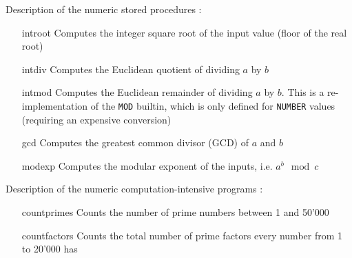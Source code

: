 \documentclass[twoside,11pt,a4paper]{article}
\newcommand{\todo}[1]{\textit{TODO: #1}}
\newcommand{\sql}[1]{\texttt{#1}}
\newcommand{\pls}[1]{\small\texttt{#1}\normalsize}
\newcommand{\plstype}[1]{\pls{#1}}
\newcommand{\oranum}{\plstype{NUMBER}}
\newcommand{\bench}[1]{\textsf{#1}}
\begin{document}
\vspace{5mm}
Description of the numeric stored procedures :
\begin{itemize}
\item[\bench{introot}] Computes the integer square root of the input value (floor of the real root)
\item[\bench{intdiv}] Computes the Euclidean quotient of dividing $a$ by $b$
\item[\bench{intmod}] Computes the Euclidean remainder of dividing $a$ by $b$. This is a re-implementation of the \sql{MOD} builtin, which is only defined for \oranum{} values (requiring an expensive conversion)
\item[\bench{gcd}] Computes the greatest common divisor (GCD) of $a$ and $b$
\item[\bench{modexp}] Computes the modular exponent of the inputs, i.e. $a^b \mod c$
\end{itemize}

\vspace{5mm}
Description of the numeric computation-intensive programs :
\begin{itemize}
\item[\bench{countprimes}] Counts the number of prime numbers between 1 and 50'000
\item[\bench{countfactors}] Counts the total number of prime factors every number from 1 to 20'000 has
\end{itemize}


%	
%
%	
%
%	

\end{document}

